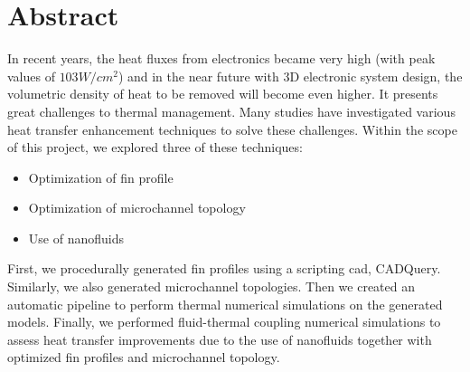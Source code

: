 \documentclass[../main.tex]{subfiles}
\begin{document}
\section{Abstract}

In recent years,
the heat fluxes from electronics became very high (with peak values of $103 W/cm^2$)
and in the near future with 3D electronic system design,
the volumetric density of heat to be removed will become even higher.
It presents great challenges to thermal management.
Many studies have investigated various heat transfer enhancement techniques to solve these challenges.
Within the scope of this project, we explored three of these techniques:

\begin{itemize}
    \item Optimization of fin profile
    \item Optimization of microchannel topology
    \item Use of nanofluids
\end{itemize}

First, we procedurally generated fin profiles using a scripting cad, CADQuery.
Similarly,  we also generated microchannel topologies.
Then we created an automatic pipeline to perform thermal numerical simulations on the generated models.
Finally,  we performed fluid-thermal coupling numerical simulations to assess heat transfer improvements due to the use of nanofluids together with optimized fin profiles and microchannel topology.
\end{document}
